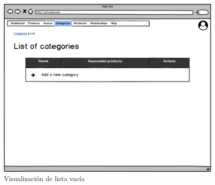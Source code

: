 \begin{figure}[H]
    \includegraphics[width=1\linewidth]{mockups/RF4.2_2.png}
    \caption{Visualización de lista vacía}
   \end{figure}
\vspace{1.0cm}

\newpage %